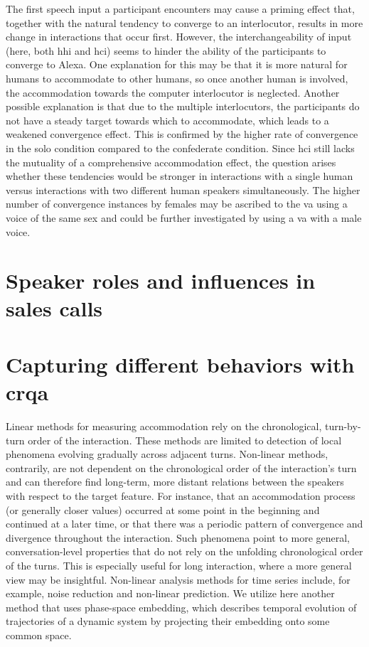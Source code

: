The first speech input a participant encounters may cause a priming effect that, together with the natural tendency to converge to an interlocutor, results in more change in interactions that occur first.
However, the interchangeability of input (here, both \ac{hhi} and \ac{hci}) seems to hinder the ability of the participants to converge to Alexa.
One explanation for this may be that it is more natural for humans to accommodate to other humans, so once another human is involved, the accommodation towards the computer interlocutor is neglected.
Another possible explanation is that due to the multiple interlocutors, the participants do not have a steady target towards which to accommodate, which leads to a weakened convergence effect.
This is confirmed by the higher rate of convergence in the solo condition compared to the confederate condition.
Since \ac{hci} still lacks the mutuality of a comprehensive accommodation effect, the question arises whether these tendencies would be stronger in interactions with a single human versus interactions with two different human speakers simultaneously.
The higher number of convergence instances by females may be ascribed to the \ac{va} using a voice of the same sex and could be further investigated by using a \ac{va} with a male voice.

\section{Speaker roles and influences in sales calls}
\label{sec:speaker_roles_and_influences_in_sales_calls}

\section{Capturing different behaviors with \acs{crqa}}
\label{sec:capturing_behaviors}

Linear methods for measuring accommodation rely on the chronological, turn-by-turn order of the interaction.
These methods are limited to detection of local phenomena evolving gradually across adjacent turns.
Non-linear methods, contrarily, are not dependent on the chronological order of the interaction's turn and can therefore find long-term, more distant relations between the speakers with respect to the target feature.
For instance, that an accommodation process (or generally closer values) occurred at some point in the beginning and continued at a later time, or that there was a periodic pattern of convergence and divergence throughout the interaction.
Such phenomena point to more general, conversation-level properties that do not rely on the unfolding chronological order of the turns.
This is especially useful for long interaction, where a more general view may be insightful.
Non-linear analysis methods for time series include, for example, noise reduction and non-linear prediction.
We utilize here another method that uses phase-space embedding, which describes temporal evolution of trajectories of a dynamic system by projecting their embedding onto some common space.

